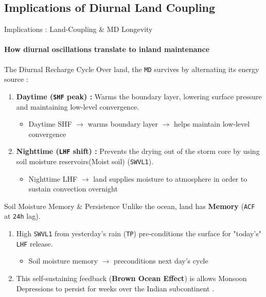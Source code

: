 \documentclass[8pt, aspectratio=169]{beamer}
\begin{document}
\subsection{Implications of Diurnal Land Coupling}
\begin{frame}{Implications : Land-Coupling \& MD Longevity}
    \framesubtitle{How diurnal oscillations translate to inland maintenance}

    \footnotesize
    \begin{block}{The Diurnal Recharge Cycle}
        Over land, the \texttt{MD} survives by alternating its energy source :
        \begin{enumerate}
            \footnotesize
            \item \textbf{Daytime (\texttt{SHF} peak) :} Warms the boundary layer, lowering surface pressure and maintaining low-level convergence.
                \footnotesize
                \begin{itemize}
                    \tiny
                    \item Daytime SHF $\rightarrow$ warms boundary layer $\rightarrow$ helps maintain low-level convergence
                \end{itemize}
            \footnotesize
            \item \textbf{Nighttime (\texttt{LHF} shift) :} Prevents the drying out of the storm core by using soil moisture reservoirs(Moist soil) (\texttt{SWVL1}).
                \begin{itemize}
                    \tiny
                    \item Nighttime LHF $\rightarrow$ land supplies moisture to atmosphere in order to sustain convection overnight
                \end{itemize}
        \end{enumerate}
    \end{block}

    \footnotesize
    \begin{block}{Soil Moisture Memory \& Persistence}
        Unlike the ocean, land has \textbf{Memory} (\texttt{ACF} at \texttt{24h} lag).
        \begin{enumerate}
            \item High \texttt{SWVL1} from yesterday's rain (\texttt{TP}) pre-conditions the surface for "today's" \texttt{LHF} release.
                \begin{itemize}
                    \tiny
                    \item Soil moisture memory $\rightarrow$ preconditions next day's cycle
                \end{itemize}
            \item This self-sustaining feedback (\textbf{Brown Ocean Effect}) is allows Monsoon Depressions to persist for weeks over the Indian subcontinent \cite{kishtawal2013tropical}.
        \end{enumerate}
    \end{block}


\end{frame}
\end{document}
